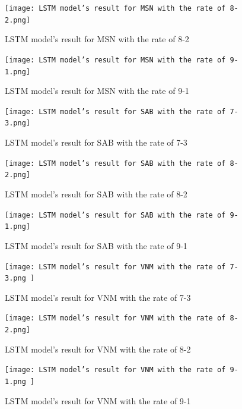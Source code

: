 \documentclass{ieeeojies}
\begin{document}
    \begin{figure}[H]

    \begin{minipage}{0.23\textwidth}
    \centering
    \texttt{[image: LSTM model’s result for MSN with the rate of 8-2.png]}
    \caption{LSTM model’s result for MSN with the rate of 8-2}
    \end{minipage}
    \hfill
    \begin{minipage}{0.23\textwidth}
    \centering
    \texttt{[image: LSTM model’s result for MSN with the rate of 9-1.png]}
    \caption{LSTM model’s result for MSN with the rate of 9-1}
    \end{minipage}
    \end{figure}
    \begin{figure}[H]
    \begin{minipage}{0.23\textwidth}
    \centering
    \texttt{[image: LSTM model’s result for SAB with the rate of 7-3.png]}
    \caption{LSTM model’s result for SAB with the rate of 7-3}
    \end{minipage}
    \hfill
    \begin{minipage}{0.23\textwidth}
    \centering
    \texttt{[image: LSTM model’s result for SAB with the rate of 8-2.png]}
    \caption{LSTM model’s result for SAB with the rate of 8-2}
    \end{minipage}
    \end{figure}
    
    \begin{figure}[H]
    \begin{minipage}{0.23\textwidth}
    \centering
    \texttt{[image: LSTM model’s result for SAB with the rate of 9-1.png]}
    \caption{LSTM model’s result for SAB with the rate of 9-1}
    \end{minipage}
    \hfill
    \begin{minipage}{0.23\textwidth}
    \centering
    \texttt{[image: LSTM model’s result for VNM with the rate of 7-3.png ]}
    \caption{LSTM model’s result for VNM with the rate of 7-3}
    \end{minipage}
    \end{figure}

    \begin{figure}[H]
    \begin{minipage}{0.23\textwidth}
    \centering
    \texttt{[image: LSTM model’s result for VNM with the rate of 8-2.png]}
    \caption{LSTM model’s result for VNM with the rate of 8-2}
    \end{minipage}
    \hfill
    \begin{minipage}{0.23\textwidth}
    \centering
    \texttt{[image: LSTM model’s result for VNM with the rate of 9-1.png ]}
    \caption{LSTM model’s result for VNM with the rate of 9-1}
    \end{minipage}
    \end{figure}
\end{document}
